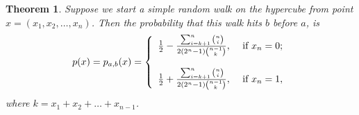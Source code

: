 \documentclass[12pt]{article}
\newtheorem{theorem}{Theorem}
\begin{document}
\begin{theorem}\label{ContThrm}
    Suppose we start a simple random walk on the hypercube from point
    $x=(x_1,x_2,\dots,x_n)$. Then the probability that this walk
    hits $b$ before $a$, is
    \begin{eqnarray*}\label{SplitFunc}
         p(x)=p_{a,b}(x) = \left\{ \begin{array}{rl}
                          \frac {{\displaystyle} 1}{{\displaystyle} 2} -\frac{{\displaystyle} \sum_{i=k+1}^{n} {n\choose i}}{{\displaystyle} 2(2^n-1){n-1\choose k}},
                              & \mbox{~if $x_n=0$;} \\ \\
                         \frac {{\displaystyle} 1}{{\displaystyle} 2} +
                         \frac{{\displaystyle} \sum_{i=k+1}^{n} {n\choose i}}{{\displaystyle} 2(2^n-1){n-1\choose k}},
                             & \mbox{~if $x_n=1$},
                         \end{array} \right.
   \end{eqnarray*}
   where $k=x_1+x_2+\dots+x_{n-1}$.
\end{theorem}
\end{document}
